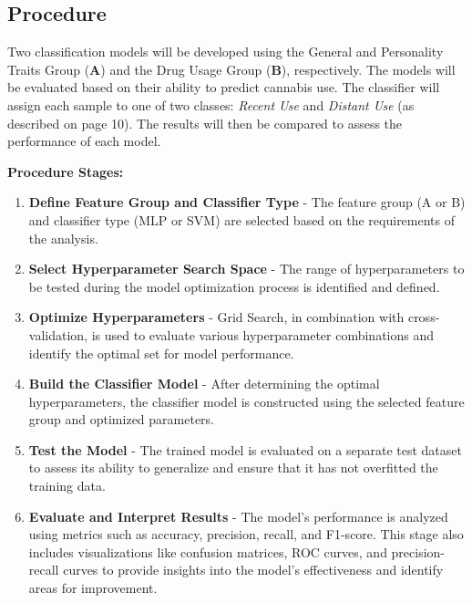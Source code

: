 \documentclass{article}
\begin{document}
\subsection{Procedure}

\hspace{1cm}Two classification models will be developed using the General and Personality Traits Group (\textbf{A}) and the Drug Usage Group (\textbf{B}), respectively. The models will be evaluated based on their ability to predict cannabis use. The classifier will assign each sample to one of two classes: \textit{Recent Use} and \textit{Distant Use} (as described on page 10). The results will then be compared to assess the performance of each model.


\textbf{Procedure Stages:} 

\begin{enumerate} 
\item \textbf{Define Feature Group and Classifier Type} - The feature group (A or B) and classifier type (MLP or SVM) are selected based on the requirements of the analysis.

\item \textbf{Select Hyperparameter Search Space} - The range of hyperparameters to be tested during the model optimization process is identified and defined.

\item \textbf{Optimize Hyperparameters} - Grid Search, in combination with cross-validation, is used to evaluate various hyperparameter combinations and identify the optimal set for model performance.

\item \textbf{Build the Classifier Model} - After determining the optimal hyperparameters, the classifier model is constructed using the selected feature group and optimized parameters.

\item \textbf{Test the Model} - The trained model is evaluated on a separate test dataset to assess its ability to generalize and ensure that it has not overfitted the training data.

\item \textbf{Evaluate and Interpret Results} - The model’s performance is analyzed using metrics such as accuracy, precision, recall, and F1-score. This stage also includes visualizations like confusion matrices, ROC curves, and precision-recall curves to provide insights into the model's effectiveness and identify areas for improvement.

\end{enumerate}
\end{document}
